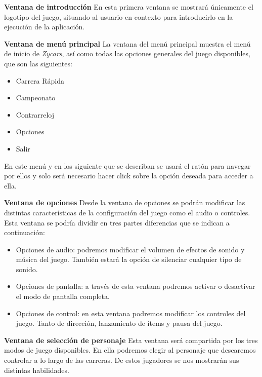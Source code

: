 \begin{description}
    \item \textbf{Ventana de introducción} En esta primera ventana se mostrará únicamente el logotipo del juego, situando al usuario en
    contexto para introducirlo en la ejecución de la aplicación.
    
    \item \textbf{Ventana de menú principal} La ventana del menú principal
    muestra el menú de inicio de \emph{Zycars}, así como 
    todas las opciones generales del juego disponibles, que son las siguientes:
        \begin{itemize}
            \item Carrera Rápida
            \item Campeonato
            \item Contrarreloj
            \item Opciones
            \item Salir
        \end{itemize}
        En este menú y en los siguiente que se describan se usará el ratón para navegar por ellos y solo será necesario
        hacer click sobre la opción deseada para acceder a ella.
    
    \item \textbf{Ventana de opciones} Desde la ventana de opciones se podrán
    modificar las distintas características de la 
    configuración del juego como el audio o controles. Esta ventana se podría dividir en tres partes diferencias que se indican
    a continuación:
        \begin{itemize}
            \item Opciones de audio: podremos modificar el volumen de efectos de sonido y música del juego. También estará la opción
            de silenciar cualquier tipo de sonido.
            
            \item Opciones de pantalla: a través de esta ventana podremos activar o desactivar el modo de pantalla completa.
            
            \item Opciones de control: en esta ventana podremos modificar los controles del juego. Tanto de dirección, lanzamiento
            de ítems y pausa del juego.
        \end{itemize}
    
    \item \textbf{Ventana de selección de personaje} Esta ventana será compartida por los tres modos de juego disponibles. En ella 
    podremos elegir al personaje que desearemos controlar a lo largo de las carreras. De estos jugadores se nos mostrarán sus 
    distintas habilidades.
    

\end{description}
